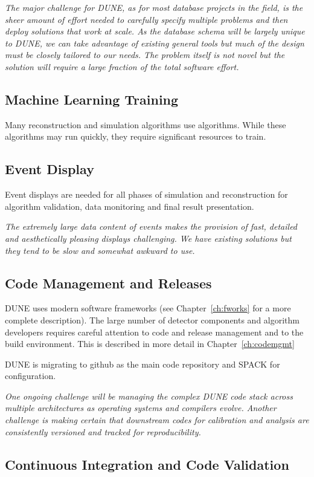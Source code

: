 \documentclass[../main-v1.tex]{subfiles}
\begin{document}
{\it The major challenge for DUNE, as for most database projects in the field, is the sheer amount of effort needed to carefully specify multiple problems and then deploy solutions that work at scale. As the database schema will be largely unique to DUNE, we can take advantage of existing general tools but much of the design must be closely tailored to our needs. The problem itself is not novel but the solution will require a large fraction of the total software effort.}


\subsection{Machine Learning Training} 
Many reconstruction and simulation algorithms use  algorithms.  While these algorithms may run quickly, they   require significant resources to train.  

\subsection{Event Display}
Event displays are needed for all phases of simulation and reconstruction for algorithm validation, data monitoring and final result presentation. 

{\it The extremely large data content of  events makes the provision of fast, detailed and aesthetically pleasing displays challenging.  We have existing solutions but they tend to be slow and somewhat awkward to use.}

\subsection{Code Management and Releases}
DUNE  uses modern software frameworks (see Chapter~\ref{ch:fworks} for a more complete description). The large number of detector components and algorithm developers requires careful attention to code and release management and to the build environment.  This is described in more detail in Chapter~\ref{ch:codemgmt}

DUNE is migrating to github as the main code repository and SPACK for configuration.  

{\it One ongoing challenge will be managing the complex DUNE code stack across multiple architectures as operating systems and compilers evolve. Another challenge is making certain that downstream codes for calibration and analysis are consistently versioned and tracked for reproducibility.} 

\subsection{Continuous Integration and Code Validation}
\end{document}
